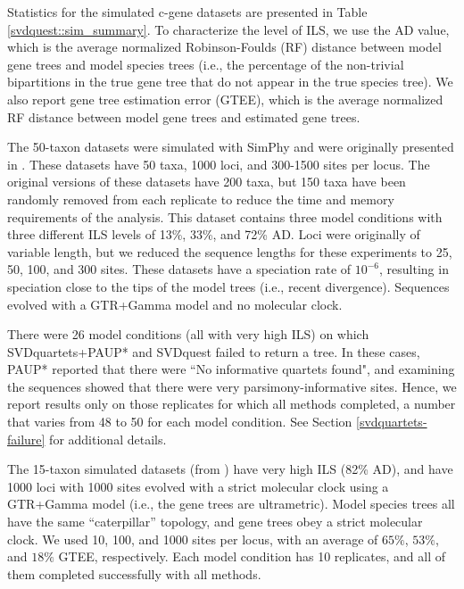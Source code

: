 Statistics for the simulated c-gene datasets are presented in Table
\ref{svdquest::sim_summary}. To characterize the level of ILS, we use the AD value,
which is the average normalized Robinson-Foulds (RF) distance
\cite{robinson1981comparison} between model gene trees and model
species trees (i.e., the percentage of the non-trivial bipartitions in
the true gene tree that do not appear in the true species tree).  We
also report gene tree estimation error (GTEE), which is the average
normalized RF distance between model gene trees
and estimated gene trees.


The 50-taxon datasets were simulated with SimPhy \cite{SimPhy} and
were originally presented in \cite{mirarab2015astral}. These datasets
have 50 taxa, 1000 loci, and 300-1500 sites per locus. The original
versions of these datasets have 200 taxa, but 150 taxa have been
randomly removed from each replicate to reduce the time and memory
requirements of the analysis. This dataset contains three model
conditions with three different ILS levels of 13\%, 33\%, and 72\%
AD. Loci were originally of variable length, but we reduced the sequence lengths for these experiments to 25, 50, 100, and 300 sites.
These datasets have a speciation rate of $10^{-6}$, resulting in speciation close to the tips of the model trees (i.e., recent divergence). 
Sequences evolved with a GTR+Gamma model and no molecular
clock.

{
There were 26 model conditions (all with very high ILS) on which SVDquartets+PAUP* and SVDquest failed to return a tree. In these cases, PAUP* reported that there were ``No informative quartets found", and examining the sequences showed that there were very parsimony-informative sites. 
Hence, we report results only on those replicates for which all methods completed, 
a number that varies from 48 to 50 for each model condition.
See Section \ref{svdquartets-failure} for additional details.
}



The 15-taxon simulated datasets (from \cite{bayzid2015weighted}) have
very high ILS (82\% AD), and have 1000 loci with 1000 sites evolved
with a strict molecular clock using a GTR+Gamma model (i.e., the gene trees are
ultrametric).  
Model species
trees all have the same ``caterpillar'' topology, and gene trees obey
a strict molecular clock. We used 10, 100, and 1000 sites per locus,
with an average of $65\%$, $53\%$, and $18\%$ GTEE, respectively. 
Each
model condition has 10 replicates, and all of them completed
successfully with all methods.



